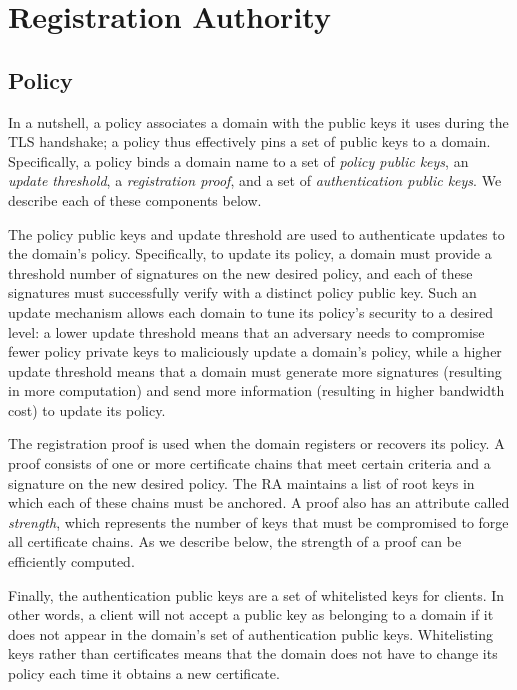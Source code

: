 \section{Registration Authority}
\label{sec:ra}

\subsection{Policy}
\label{sec:ra:policy}

In a nutshell, a policy associates a domain with the public keys it uses during
the TLS handshake; a policy thus effectively pins a set of public keys to a
domain. Specifically, a policy binds a domain name to a set of \emph{policy
public keys}, an \emph{update threshold}, a \emph{registration proof}, and a set
of \emph{authentication public keys}. We describe each of these components
below.

The policy public keys and update threshold are used to authenticate updates to
the domain's policy. Specifically, to update its policy, a domain must provide a
threshold number of signatures on the new desired policy, and each of these
signatures must successfully verify with a distinct policy public key. Such an
update mechanism allows each domain to tune its policy's security to a desired
level: a lower update threshold means that an adversary needs to compromise
fewer policy private keys to maliciously update a domain's policy, while a
higher update threshold means that a domain must generate more signatures
(resulting in more computation) and send more information (resulting in higher
bandwidth cost) to update its policy.

The registration proof is used when the domain registers or recovers its policy.
A proof consists of one or more certificate chains that meet certain criteria
and a signature on the new desired policy. The RA maintains a list of root keys
in which each of these chains must be anchored. A proof also has an attribute
called \emph{strength}, which represents the number of keys that must be
compromised to forge all certificate chains. As we describe below, the strength
of a proof can be efficiently computed.

Finally, the authentication public keys are a set of whitelisted keys for
clients. In other words, a client will not accept a public key as belonging to a
domain if it does not appear in the domain's set of authentication public keys.
Whitelisting keys rather than certificates means that the domain does not have
to change its policy each time it obtains a new certificate. 

